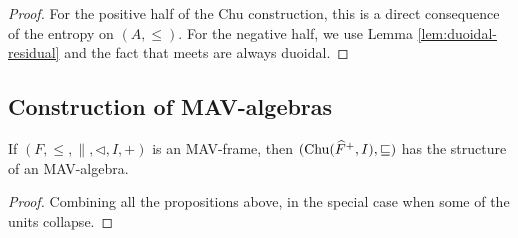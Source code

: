 \begin{proof}
  For the positive half of the Chu construction, this is a direct
  consequence of the entropy on $(A, \leq)$. For the negative half, we
  use Lemma \ref{lem:duoidal-residual} and the fact that meets are
  always duoidal.
\end{proof}

\subsection{Construction of MAV-algebras}

\begin{theorem}
  If $(F, \leq, \parallel, \lhd, I, +)$ is an MAV-frame, then
  $(\mathrm{Chu}(\widehat{F}^+, I), \sqsubseteq)$ has the structure of an
  MAV-algebra.
\end{theorem}

\begin{proof}
  Combining all the propositions above, in the special case when some
  of the units collapse.
\end{proof}
